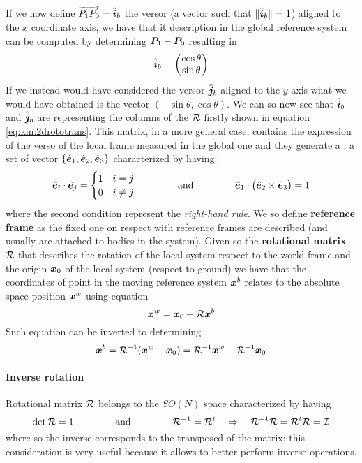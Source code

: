 	If we now define $\overrightarrow{P_1 P_0} = \hat{\boldsymbol{i}}_b $ the versor (a vector such that $\|\hat{\boldsymbol{i}}_b\|=1$) aligned to the $x$ coordinate axis, we have that it description in the global reference system can be computed by determining $\boldsymbol{P}_1 - \boldsymbol{P}_0$ resulting in
	\[ \hat{\boldsymbol{i}}_b = \begin{pmatrix} \cos\theta \\ \sin\theta \end{pmatrix} \]
	If we instead would have considered the versor $\hat{\boldsymbol{j}}_b$ aligned to the $y$ axis what we would have obtained is the vector $(-\sin\theta ,\cos\theta)$. We can so now see that $\hat{\boldsymbol{i}}_b$ and $\hat{\boldsymbol{j}}_b$ are representing the columns of the  $\mathcal R$ firstly shown in equation \ref{eq:kin:2drototrans}. This matrix, in a more general case, contains the expression of the verso of the local frame measured in the global one and they generate a , a set of vector $\{\hat{\boldsymbol{e}}_1,\hat{\boldsymbol{e}}_2, \hat{\boldsymbol{e}}_3\}$ characterized by having:
	\[ \hat{\boldsymbol{e}}_i\cdot \hat{\boldsymbol{e}}_j = \begin{cases}
		1 & i = j \\ 0 & i \neq j 
	\end{cases} \hspace{1.5cm}  \textrm{and} \hspace{1.5cm} \hat{\boldsymbol{e}}_1 \cdot \big(\hat{\boldsymbol{e}}_2\times \hat{\boldsymbol{e}}_3\big) = 1\]
	where the second condition represent the \textit{right-hand rule}. We so define  \textbf{reference frame} as the fixed one on respect with  reference frames are described (and usually are attached to bodies in the system). Given so the \textbf{rotational matrix} $\mathcal R$ that describes the rotation of the local system respect to the world frame and the origin $\boldsymbol{x}_0$ of the local system (respect to ground) we have that the coordinates of point in the moving reference system $\boldsymbol{x}^b$ relates to the absolute space position $\boldsymbol{x}^w$ using equation
	\begin{equation} \label{eq:kin:directrototrans}
		\boldsymbol{x}^w = \boldsymbol{x}_0 + \mathcal R \boldsymbol{x}^b
	\end{equation}
	Such equation can be inverted to determining
	\begin{equation} \label{eq:kin:inversrototrans}
		\boldsymbol{x}^b = \mathcal R^{-1} (\boldsymbol{x}^w -\boldsymbol{x}_0) = \mathcal R^{-1} \boldsymbol{x}^w - \mathcal R^{-1} \boldsymbol{x}_0
	\end{equation}
	
	\paragraph{Inverse rotation} Rotational matrix $\mathcal R$ belongs to the  $SO(N)$ space characterized by having
	\begin{equation}
		\det \mathcal R = 1 \hspace{1.5cm} \textrm{and} \hspace{1.5cm} \mathcal R^{-1} = \mathcal R^t \quad \Rightarrow \quad \mathcal R^{-1} \mathcal R = \mathcal R^t \mathcal R= \mathcal I
	\end{equation}
	where so the inverse corresponds to the transposed of the matrix: this consideration is very useful because it allows to better perform inverse operations.
	
